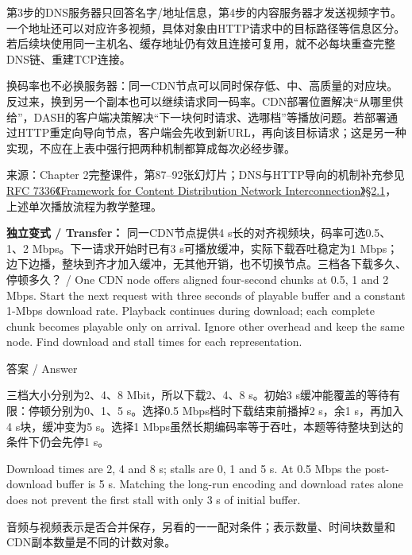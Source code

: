 第3步的DNS服务器只回答名字/地址信息，第4步的内容服务器才发送视频字节。一个地址还可以对应许多视频，具体对象由HTTP请求中的目标路径等信息区分。若后续块使用同一主机名、缓存地址仍有效且连接可复用，就不必每块重查完整DNS链、重建TCP连接。


换码率也不必换服务器：同一CDN节点可以同时保存低、中、高质量的对应块。反过来，换到另一个副本也可以继续请求同一码率。CDN部署位置解决“从哪里供给”，DASH的客户端决策解决“下一块何时请求、选哪档”等播放问题。若部署通过HTTP重定向导向节点，客户端会先收到新URL，再向该目标请求；这是另一种实现，不应在上表中强行把两种机制都算成每次必经步骤。


来源：Chapter 2完整课件，第87–92张幻灯片；DNS与HTTP导向的机制补充参见\href{https://www.rfc-editor.org/rfc/rfc7336.html\#section-2.1}{RFC 7336《Framework for Content Distribution Network Interconnection》§2.1}，上述单次播放流程为教学整理。





\textbf{独立变式 / Transfer：} 同一CDN节点提供4 s长的对齐视频块，码率可选0.5、1、2 Mbps。下一请求开始时已有3 s可播放缓冲，实际下载吞吐稳定为1 Mbps；边下边播，整块到齐才加入缓冲，无其他开销，也不切换节点。三档各下载多久、停顿多久？ / One CDN node offers aligned four-second chunks at 0.5, 1 and 2 Mbps. Start the next request with three seconds of playable buffer and a constant 1-Mbps download rate. Playback continues during download; each complete chunk becomes playable only on arrival. Ignore other overhead and keep the same node. Find download and stall times for each representation.



\begin{StudySolution}{答案 / Answer}


三档大小分别为2、4、8 Mbit，所以下载2、4、8 s。初始3 s缓冲能覆盖的等待有限：停顿分别为0、1、5 s。选择0.5 Mbps档时下载结束前播掉2 s，余1 s，再加入4 s块，缓冲变为5 s。选择1 Mbps虽然长期编码率等于吞吐，本题等待整块到达的条件下仍会先停1 s。


Download times are 2, 4 and 8 s; stalls are 0, 1 and 5 s. At 0.5 Mbps the post-download buffer is 5 s. Matching the long-run encoding and download rates alone does not prevent the first stall with only 3 s of initial buffer.


\end{StudySolution}


音频与视频表示是否合并保存，另看的一一配对条件；表示数量、时间块数量和CDN副本数量是不同的计数对象。


